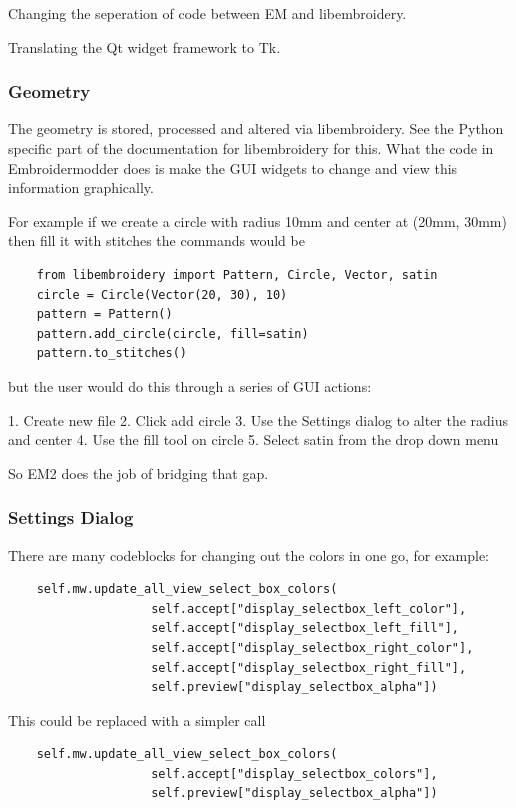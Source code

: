 \documentclass[a4paper, 11pt]{report}
\begin{document}
Changing the seperation of code between EM and libembroidery.

Translating the Qt widget framework to Tk.

\subsubsection{Geometry}

The geometry is stored, processed and altered via libembroidery. See the Python specific part of the documentation for libembroidery for this. What the code in Embroidermodder does is make the GUI widgets to change and view this information graphically.

For example if we create a circle with radius 10mm and center at (20mm, 30mm) then fill it with stitches the commands would be

\begin{verbatim}
    from libembroidery import Pattern, Circle, Vector, satin
    circle = Circle(Vector(20, 30), 10)
    pattern = Pattern()
    pattern.add_circle(circle, fill=satin)
    pattern.to_stitches()
\end{verbatim}

but the user would do this through a series of GUI actions:

1. Create new file
2. Click add circle
3. Use the Settings dialog to alter the radius and center
4. Use the fill tool on circle
5. Select satin from the drop down menu

So EM2 does the job of bridging that gap.

\subsubsection{Settings Dialog}

There are many codeblocks for changing out the colors in one go, for example:
    
\begin{verbatim}
    self.mw.update_all_view_select_box_colors(
                    self.accept["display_selectbox_left_color"],
                    self.accept["display_selectbox_left_fill"],
                    self.accept["display_selectbox_right_color"],
                    self.accept["display_selectbox_right_fill"],
                    self.preview["display_selectbox_alpha"])
\end{verbatim}

This could be replaced with a simpler call

\begin{verbatim}
    self.mw.update_all_view_select_box_colors(
                    self.accept["display_selectbox_colors"],
                    self.preview["display_selectbox_alpha"])
\end{verbatim}
\end{document}
